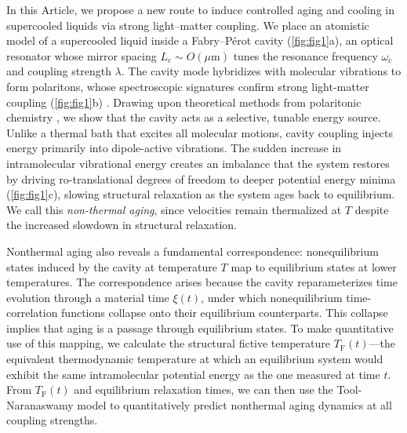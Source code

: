 \documentclass[%
 reprint,
 amsmath,amssymb,
 aps,
]{revtex4-2}
\begin{document}
In this Article, we propose a new route to induce controlled aging and cooling in supercooled liquids via strong light–matter coupling. 
We place an atomistic model of a supercooled liquid inside a Fabry–Pérot cavity (\cref{fig:fig1}a), an optical resonator whose mirror spacing $L_\mathrm{c} \sim O(\mu \mathrm{m})$ tunes the resonance frequency $\omega_\mathrm{c}$ and coupling strength $\lambda$. 
The cavity mode hybridizes with molecular vibrations to form polaritons, whose spectroscopic signatures confirm strong light-matter coupling (\cref{fig:fig1}b) \cite{vahala2003optical,aspelmeyer2014cavity}.
Drawing upon theoretical methods from polaritonic chemistry \cite{ebbesen2023introduction,Dunkelberger2022}, we show that the cavity acts as a selective, tunable energy source. 
Unlike a thermal bath that excites all molecular motions, cavity coupling injects energy primarily into dipole-active vibrations.
The sudden increase in intramolecular vibrational energy creates an imbalance that the system restores by driving ro-translational degrees of freedom to deeper potential energy minima (\cref{fig:fig1}c), slowing structural relaxation as the system ages back to equilibrium.
We call this \textit{non-thermal aging}, since velocities remain thermalized at $T$ despite the increased slowdown in structural relaxation.

Nonthermal aging also reveals a fundamental correspondence: nonequilibrium states induced by the cavity at temperature $T$ map to equilibrium states at lower temperatures. 
The correspondence arises because the cavity reparameterizes time evolution through a material time $\xi(t)$, under which nonequilibrium time-correlation functions collapse onto their equilibrium counterparts. 
This collapse implies that aging is a passage through equilibrium states.
To make quantitative use of this mapping, we calculate the structural fictive temperature $T_\mathrm{F}(t)$---the equivalent thermodynamic temperature at which an equilibrium system would exhibit the same intramolecular potential energy as the one measured at time $t$. 
From $T_\mathrm{F}(t)$ and equilibrium relaxation times, we can then use the Tool-Naranaswamy model to quantitatively predict nonthermal aging dynamics at all coupling strengths.
\end{document}
